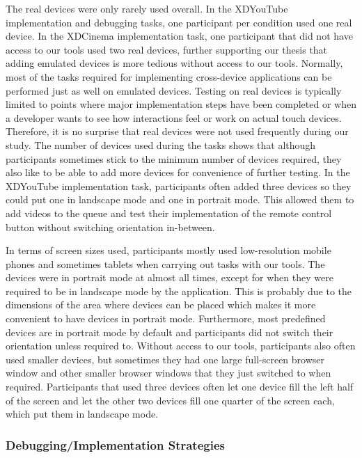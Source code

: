 The real devices were only rarely used overall. In the XDYouTube implementation and debugging tasks, one participant per condition used one real device. In the XDCinema implementation task, one participant that did not have access to our tools used two real devices, further supporting our thesis that adding emulated devices is more tedious without access to our tools. Normally, most of the tasks required for implementing cross-device applications can be performed just as well on emulated devices. Testing on real devices is typically limited to points where major implementation steps have been completed or when a developer wants to see how interactions feel or work on actual touch devices. Therefore, it is no surprise that real devices were not used frequently during our study. The number of devices used during the tasks shows that although participants sometimes stick to the minimum number of devices required, they also like to be able to add more devices for convenience of further testing. In the XDYouTube implementation task, participants often added three devices so they could put one in landscape mode and one in portrait mode. This allowed them to add videos to the queue and test their implementation of the remote control button without switching orientation in-between. 

In terms of screen sizes used, participants mostly used low-resolution mobile phones and sometimes tablets when carrying out tasks with our tools. The devices were in portrait mode at almost all times, except for when they were required to be in landscape mode by the application. This is probably due to the dimensions of the area where devices can be placed which makes it more convenient to have devices in portrait mode. Furthermore, most predefined devices are in portrait mode by default and participants did not switch their orientation unless required to. Without access to our tools, participants also often used smaller devices, but sometimes they had one large full-screen browser window and other smaller browser windows that they just switched to when required. Participants that used three devices often let one device fill the left half of the screen and let the other two devices fill one quarter of the screen each, which put them in landscape mode. 

\subsubsection{Debugging/Implementation Strategies}

